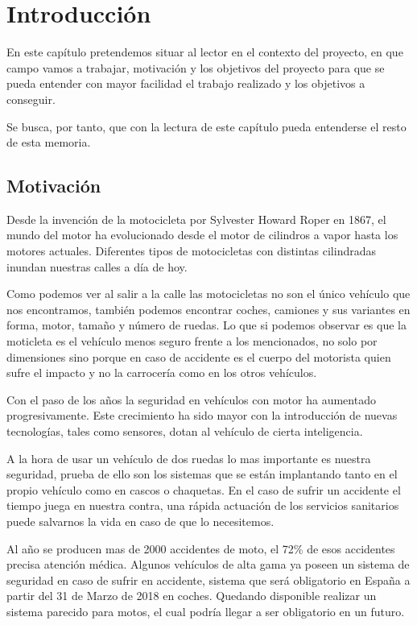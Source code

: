 \chapter{Introducción}\label{cap.introduccion}
	
		En este capítulo pretendemos situar al lector en el contexto del proyecto, en que campo vamos a trabajar, motivación y los objetivos del proyecto para que se pueda entender con mayor facilidad el trabajo realizado y los objetivos a conseguir.
		
		Se busca, por tanto, que con la lectura de este capítulo pueda entenderse el resto de esta memoria.
		
	\section{Motivación}
		
		Desde la invención de la motocicleta por Sylvester Howard Roper en 1867, el mundo del motor ha evolucionado desde el motor de cilindros a vapor hasta los motores actuales. Diferentes tipos de motocicletas con distintas cilindradas inundan nuestras calles a día de hoy.
		
		Como podemos ver al salir a la calle las motocicletas no son el único vehículo que nos encontramos, también podemos encontrar coches, camiones y sus variantes en forma, motor, tama\~no y número de ruedas. Lo que si podemos observar es que la moticleta es el vehículo menos seguro frente a los mencionados, no solo por dimensiones sino porque en caso de accidente es el cuerpo del motorista quien sufre el impacto y no la carrocería como en los otros vehículos.
		
		Con el paso de los a\~nos la seguridad en vehículos con motor ha aumentado progresivamente. Este crecimiento ha sido mayor con la introducción de nuevas tecnologías, tales como sensores, dotan al vehículo de cierta inteligencia.
		
		A la hora de usar un vehículo de dos ruedas lo mas importante es nuestra seguridad, prueba de ello son los sistemas que se están implantando tanto en el propio vehículo como en cascos o chaquetas. En el caso de sufrir un accidente el tiempo juega en nuestra contra, una rápida actuación de los servicios sanitarios puede salvarnos la vida en caso de que lo necesitemos.
		
		Al a\~no se producen mas de 2000 accidentes de moto, el 72\% de esos accidentes precisa atención médica. Algunos vehículos de alta gama ya poseen un sistema de seguridad en caso de sufrir en accidente, sistema que será obligatorio en Espa\~na a partir del 31 de Marzo de 2018 en coches. Quedando disponible realizar un sistema parecido para motos, el cual podría llegar a ser obligatorio en un futuro.
		
